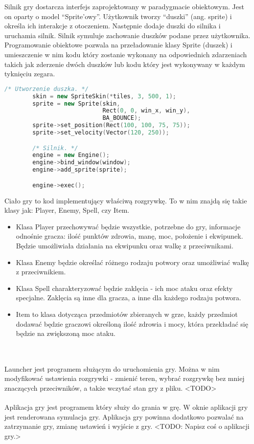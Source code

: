\documentclass[12pt, titlepage]{article}
\begin{document}
\noindent
Silnik gry dostarcza interfejs zaprojektowany w
paradygmacie obiektowym. Jest on oparty o model
"`Sprite'owy"'. Użytkownik tworzy "`duszki"' (ang.
sprite) i określa ich interakcje z otoczeniem.
Następnie dodaje duszki do silnika i uruchamia
silnik. Silnik symuluje zachowanie duszków
podane przez użytkownika. Programowanie obiektowe
pozwala na przeładowanie klasy Sprite (duszek) i
umieszczenie w nim kodu który zostanie wykonany na
odpowiednich zdarzeniach takich jak zderzenie dwóch
duszków lub kodu który jest wykonywany w każdym
tyknięciu zegara.

\begin{lstlisting}[language=C++, caption=Interfejs silnika - kod poglądowy]
        /* Utworzenie duszka. */
        skin = new SpriteSkin(*tiles, 3, 500, 1);
        sprite = new Sprite(skin,
                            Rect(0, 0, win_x, win_y),
                            BA_BOUNCE);
        sprite->set_position(Rect(100, 100, 75, 75));
        sprite->set_velocity(Vector(120, 250));

        /* Silnik. */
        engine = new Engine();
        engine->bind_window(window);
        engine->add_sprite(sprite);

        engine->exec();
\end{lstlisting}

\noindent
Ciało gry to kod implementujący właściwą rozgrywkę. To w nim znajdą się takie klasy jak: Player, Enemy, Spell, czy Item.
\begin{itemize}
	\item Klasa Player przechowywać będzie wszystkie, potrzebne do gry, informacje odnośnie gracza: ilość punktów zdrowia, manę, moc, położenie i ekwipunek. Będzie umożliwiała działania na ekwipunku oraz walkę z przeciwnikami.  
	\item Klasa Enemy będzie określać różnego rodzaju potwory oraz umożliwiać walkę z przeciwnikiem.
	\item Klasa Spell charakteryzować będzie zaklęcia - ich moc ataku oraz efekty specjalne. Zaklęcia są inne dla gracza, a inne dla każdego rodzaju potwora. 
	\item Item to klasa dotycząca przedmiotów zbieranych w grze, każdy przedmiot dodawać będzie graczowi określoną ilość zdrowia i mocy, która przekładać się będzie na zwiększoną moc ataku.
\end{itemize}
\\~\\
Launcher jest programem służącym do uruchomienia gry. Można w nim modyfikować ustawienia rozgrywki - zmienić teren,  wybrać rozgrywkę bez mniej znaczących przeciwników, a także wczytać stan gry z pliku. <TODO>
\\~\\
Aplikacja gry jest programem który służy
do grania w grę. W oknie aplikacji gry jest
renderowana symulacja gry. Aplikacja gry
powinna dodatkowo pozwalać na zatrzymanie
gry, zmianę ustawień i wyjście z gry. <TODO:
Napisz coś o aplikacji gry.>
\end{document}
